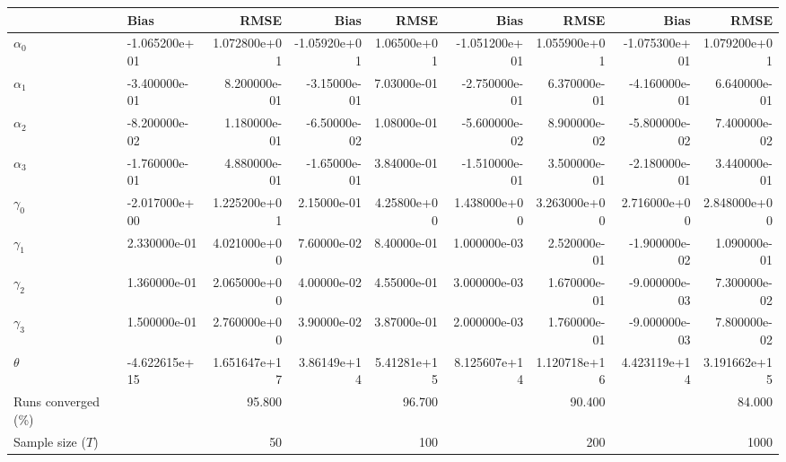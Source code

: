 
\begin{tabular}[t]{llrrrrrrr}
\toprule
  & Bias & RMSE & Bias & RMSE & Bias & RMSE & Bias & RMSE\\
\midrule
$\alpha_{0}$ & -1.065200e+01 & 1.072800e+01 & -1.05920e+01 & 1.06500e+01 & -1.051200e+01 & 1.055900e+01 & -1.075300e+01 & 1.079200e+01\\
$\alpha_{1}$ & -3.400000e-01 & 8.200000e-01 & -3.15000e-01 & 7.03000e-01 & -2.750000e-01 & 6.370000e-01 & -4.160000e-01 & 6.640000e-01\\
$\alpha_{2}$ & -8.200000e-02 & 1.180000e-01 & -6.50000e-02 & 1.08000e-01 & -5.600000e-02 & 8.900000e-02 & -5.800000e-02 & 7.400000e-02\\
$\alpha_{3}$ & -1.760000e-01 & 4.880000e-01 & -1.65000e-01 & 3.84000e-01 & -1.510000e-01 & 3.500000e-01 & -2.180000e-01 & 3.440000e-01\\
$\gamma_{0}$ & -2.017000e+00 & 1.225200e+01 & 2.15000e-01 & 4.25800e+00 & 1.438000e+00 & 3.263000e+00 & 2.716000e+00 & 2.848000e+00\\
$\gamma_{1}$ & 2.330000e-01 & 4.021000e+00 & 7.60000e-02 & 8.40000e-01 & 1.000000e-03 & 2.520000e-01 & -1.900000e-02 & 1.090000e-01\\
$\gamma_{2}$ & 1.360000e-01 & 2.065000e+00 & 4.00000e-02 & 4.55000e-01 & 3.000000e-03 & 1.670000e-01 & -9.000000e-03 & 7.300000e-02\\
$\gamma_{3}$ & 1.500000e-01 & 2.760000e+00 & 3.90000e-02 & 3.87000e-01 & 2.000000e-03 & 1.760000e-01 & -9.000000e-03 & 7.800000e-02\\
$\theta$ & -4.622615e+15 & 1.651647e+17 & 3.86149e+14 & 5.41281e+15 & 8.125607e+14 & 1.120718e+16 & 4.423119e+14 & 3.191662e+15\\
Runs converged (\%) &  & 95.800 &  & 96.700 &  & 90.400 &  & 84.000\\
Sample size ($T$) &  & 50 &  & 100 &  & 200 &  & 1000\\
\bottomrule
\end{tabular}
